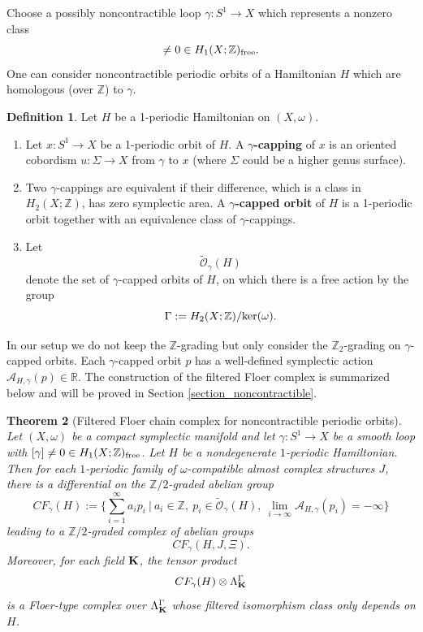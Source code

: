 \documentclass[reqno, 10pt]{amsart}
\numberwithin{equation}{section}
\numberwithin{equation}{section}
\newtheorem{thm}{Theorem}[section]
\theoremstyle{definition}
\newtheorem{defn}[thm]{Definition}
\theoremstyle{remark}
\newcommand{\beqn}{\begin{equation*}}
\newcommand{\eeqn}{\end{equation*}}
\newcommand{\mb}{\mathbb}
\newcommand{\mc}{\mathcal}
\begin{document}
Choose a possibly noncontractible loop $\gamma: S^1 \to X$ which represents a nonzero class
\beqn
[\gamma] \neq 0 \in H_1(X; {\mb Z})_{\rm free}.
\eeqn
One can consider noncontractible periodic orbits of a Hamiltonian $H$ which are homologous (over ${\mb Z}$) to $\gamma$. 
\begin{defn}\label{defn_gamma_capping}
Let $H$ be a 1-periodic Hamiltonian on $(X, \omega)$.

\begin{enumerate}
\item Let $x: S^1 \to X$ be a 1-periodic orbit of $H$. A {\bf $\gamma$-capping} of $x$ is an oriented cobordism $u: \Sigma \to X$ from $\gamma$ to $x$ (where $\Sigma$ could be a higher genus surface).

\item Two $\gamma$-cappings are equivalent if their difference, which is a class in $H_2(X; {\mb Z})$, has zero symplectic area. A {\bf $\gamma$-capped orbit} of $H$ is a 1-periodic orbit together with an equivalence class of $\gamma$-cappings. 

\item Let 
\beqn
\tilde {\mc O}_\gamma(H)
\eeqn
denote the set of $\gamma$-capped orbits of $H$, on which there is a free action by the group
\beqn
\Gamma:= H_2(X; {\mb Z})/ {\rm ker} (\omega).
\eeqn

\end{enumerate}
\end{defn}

In our setup we do not keep the ${\mb Z}$-grading but only consider the ${\mb Z}_2$-grading on $\gamma$-capped orbits. Each $\gamma$-capped orbit $p$ has a well-defined symplectic action ${\mc A}_{H,\gamma} (p)\in {\mb R}$. The construction of the filtered Floer complex is summarized below and will be proved in Section \ref{section_noncontractible}.


\begin{thm}[Filtered Floer chain complex for noncontractible periodic orbits]\label{thm_Floer_noncontractible}
Let $(X, \omega)$ be a compact symplectic manifold and let $\gamma:S^1 \to X$ be a smooth loop with $[\gamma] \neq 0 \in H_1(X; {\mb Z})_{\rm free}$. Let $H$ be a nondegenerate $1$-periodic Hamiltonian. Then for each $1$-periodic family of $\omega$-compatible almost complex structures $J$, there is a differential on the ${\mb Z}/2$-graded abelian group
\beqn
CF_\gamma ( H):= \Big\{ \sum_{i=1}^\infty a_i p_i\ |\ a_i \in {\mb Z},\ p_i \in \tilde {\mc O}_\gamma(H),\ \lim_{i \to \infty} {\mc A}_{H,\gamma} (p_i) = -\infty \Big\}
\eeqn
leading to a ${\mb Z}/2$-graded  complex of abelian groups
\beqn
CF_\gamma(H, J, \Xi).
\eeqn
Moreover, for each field ${\bf K}$, the tensor product
\beqn
CF_\gamma(H) \otimes \Lambda_{\bf K}^\Gamma
\eeqn
is a Floer-type complex over $\Lambda_{\bf K}^\Gamma$ whose filtered isomorphism class only depends on $H$.
\end{thm}
\end{document}
